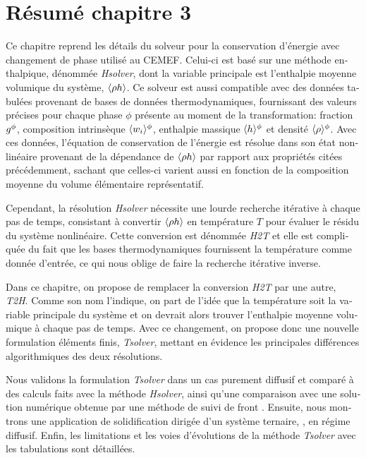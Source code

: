 \clearpage
\section*{Résumé chapitre 3}

\begin{otherlanguage}{french}
{\small

Ce chapitre reprend les détails du solveur pour la conservation d'énergie avec changement de phase utilisé au CEMEF.
Celui-ci est basé sur une méthode enthalpique, dénommée \emph{Hsolver}, dont la variable principale est l'enthalpie
moyenne volumique du système, $\langle \rho h \rangle$. Ce solveur est aussi compatible avec des données tabulées provenant de bases de données
thermodynamiques, fournissant des valeurs précises pour chaque phase $\phi$ présente au moment de la transformation: 
fraction ${g^{\phi}} $, composition intrinsèque $\langle w_i \rangle^\phi$, enthalpie massique $\langle h \rangle^{\phi} $ et densité $\langle \rho \rangle^{\phi} $. 
Avec ces données, l'équation de conservation de l'énergie est résolue dans son état nonlinéaire 
provenant de la dépendance de $\langle \rho h \rangle$ par rapport aux propriétés citées précédemment, sachant que celles-ci varient
aussi en fonction de la composition moyenne du volume élémentaire représentatif.


Cependant, la résolution \emph{Hsolver} nécessite une lourde recherche itérative à chaque pas de temps, consistant à convertir
$\langle \rho h \rangle$ en température $T$ pour évaluer le résidu du système nonlinéaire. Cette conversion est dénommée \emph{H2T} et elle est
compliquée du fait que les bases thermodynamiques fournissent la température comme donnée d'entrée, ce qui nous oblige de faire 
la recherche itérative inverse.


Dans ce chapitre, on propose de remplacer la conversion \emph{H2T} par une autre, \emph{T2H}. Comme son nom l'indique,
on part de l'idée que la température soit la variable principale du système et on devrait alors trouver l'enthalpie moyenne volumique
à chaque pas de temps. Avec ce changement, on propose donc une nouvelle formulation éléments finis, \emph{Tsolver}, mettant en évidence les principales
différences algorithmiques des deux résolutions.


Nous validons la formulation \emph{Tsolver} dans un cas purement diffusif et comparé à des calculs faits avec la méthode \emph{Hsolver}, 
ainsi qu'une comparaison avec une solution numérique obtenue par une méthode de suivi de front \citep{gandin_constrained_2000}.
Ensuite, nous montrons une application de solidification dirigée d'un système ternaire, , en régime diffusif.
Enfin, les limitations et les voies d'évolutions de la méthode \emph{Tsolver} avec les tabulations sont détaillées.

}
\end{otherlanguage}